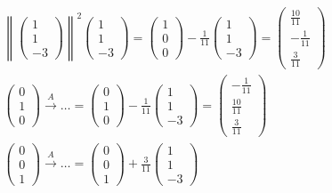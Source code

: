 \documentclass[12pt]{article}
\newcommand{\norm}[1]{\left\lVert#1\right\rVert}
\begin{document}
\begin{enumerate}[label=(\alph*)]
\begin{gather*}
{		}{
			\norm{\begin{pmatrix} 1 \\ 1 \\ -3 \end{pmatrix}}^2
		}
		\begin{pmatrix} 1 \\ 1 \\ -3 \end{pmatrix}
		=
		\begin{pmatrix} 1 \\ 0 \\ 0 \end{pmatrix}
		-
		\frac{1}{11}
		\begin{pmatrix} 1 \\ 1 \\ -3 \end{pmatrix}
		=
		\begin{pmatrix}
			\frac{10}{11} \\ -\frac{1}{11} \\ \frac{3}{11}
		\end{pmatrix}
		\\
		\begin{pmatrix} 0 \\ 1 \\ 0 \end{pmatrix}
		\overset{A}{\longrightarrow}
		\ldots
		=
		\begin{pmatrix} 0 \\ 1 \\ 0 \end{pmatrix}
		-
		\frac{1}{11}
		\begin{pmatrix} 1 \\ 1 \\ -3 \end{pmatrix}
		=
		\begin{pmatrix}
			-\frac{1}{11} \\ \frac{10}{11} \\ \frac{3}{11}
		\end{pmatrix}
		\\
		\begin{pmatrix} 0 \\ 0 \\ 1 \end{pmatrix}
		\overset{A}{\longrightarrow}
		\ldots
		=
		\begin{pmatrix} 0 \\ 0 \\ 1 \end{pmatrix}
		+
		\frac{3}{11}
		\begin{pmatrix} 1 \\ 1 \\ -3 \end{pmatrix}

\end{gather*}
\end{enumerate}
\end{document}
